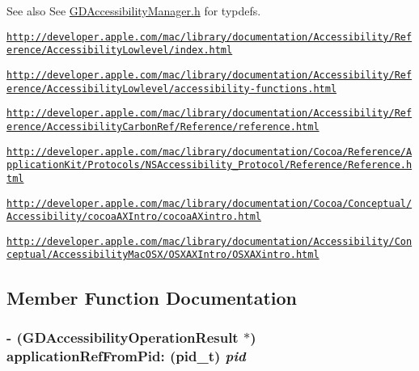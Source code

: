 \begin{DoxySeeAlso}{See also}
See \hyperlink{_g_d_accessibility_manager_8h}{GDAccessibilityManager.h} for typdefs. 

\href{http://developer.apple.com/mac/library/documentation/Accessibility/Reference/AccessibilityLowlevel/index.html}{\tt http://developer.apple.com/mac/library/documentation/Accessibility/Reference/AccessibilityLowlevel/index.html} 

\href{http://developer.apple.com/mac/library/documentation/Accessibility/Reference/AccessibilityLowlevel/accessibility-functions.html}{\tt http://developer.apple.com/mac/library/documentation/Accessibility/Reference/AccessibilityLowlevel/accessibility-\/functions.html} 

\href{http://developer.apple.com/mac/library/documentation/Accessibility/Reference/AccessibilityCarbonRef/Reference/reference.html}{\tt http://developer.apple.com/mac/library/documentation/Accessibility/Reference/AccessibilityCarbonRef/Reference/reference.html} 

\href{http://developer.apple.com/mac/library/documentation/Cocoa/Reference/ApplicationKit/Protocols/NSAccessibility_Protocol/Reference/Reference.html}{\tt http://developer.apple.com/mac/library/documentation/Cocoa/Reference/ApplicationKit/Protocols/NSAccessibility\_\-Protocol/Reference/Reference.html} 

\href{http://developer.apple.com/mac/library/documentation/Cocoa/Conceptual/Accessibility/cocoaAXIntro/cocoaAXintro.html}{\tt http://developer.apple.com/mac/library/documentation/Cocoa/Conceptual/Accessibility/cocoaAXIntro/cocoaAXintro.html} 

\href{http://developer.apple.com/mac/library/documentation/Accessibility/Conceptual/AccessibilityMacOSX/OSXAXIntro/OSXAXintro.html}{\tt http://developer.apple.com/mac/library/documentation/Accessibility/Conceptual/AccessibilityMacOSX/OSXAXIntro/OSXAXintro.html} 
\end{DoxySeeAlso}


\subsection{Member Function Documentation}
\hypertarget{interface_g_d_accessibility_manager_a214e4ffa1c1e2891a733e7779ec687d3}{
\subsubsection[{applicationRefFromPid:}]{\setlength{\rightskip}{0pt plus 5cm}-\/ ({\bf GDAccessibilityOperationResult} $\ast$) applicationRefFromPid: (pid\_\-t) {\em pid}}}
\label{interface_g_d_accessibility_manager_a214e4ffa1c1e2891a733e7779ec687d3}


